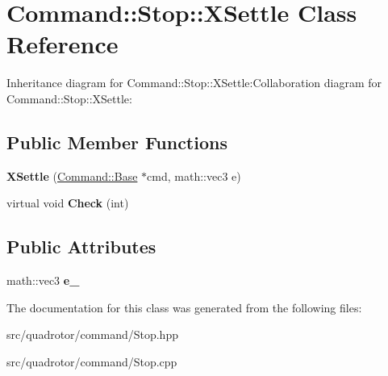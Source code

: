 \hypertarget{classCommand_1_1Stop_1_1XSettle}{
\section{Command::Stop::XSettle Class Reference}
\label{classCommand_1_1Stop_1_1XSettle}
}
Inheritance diagram for Command::Stop::XSettle:Collaboration diagram for Command::Stop::XSettle:\subsection*{Public Member Functions}
\begin{DoxyCompactItemize}
\item 
\hypertarget{classCommand_1_1Stop_1_1XSettle_aacbc62cb356f0441f910e837b2cd0889}{
{\bfseries XSettle} (\hyperlink{classCommand_1_1Base}{Command::Base} $\ast$cmd, math::vec3 e)}
\label{classCommand_1_1Stop_1_1XSettle_aacbc62cb356f0441f910e837b2cd0889}

\item 
\hypertarget{classCommand_1_1Stop_1_1XSettle_a60ea7a816a7ea0d656551aa84a484d4d}{
virtual void {\bfseries Check} (int)}
\label{classCommand_1_1Stop_1_1XSettle_a60ea7a816a7ea0d656551aa84a484d4d}

\end{DoxyCompactItemize}
\subsection*{Public Attributes}
\begin{DoxyCompactItemize}
\item 
\hypertarget{classCommand_1_1Stop_1_1XSettle_a96f016552eec74ab167d3e0c663a8733}{
math::vec3 {\bfseries e\_\-}}
\label{classCommand_1_1Stop_1_1XSettle_a96f016552eec74ab167d3e0c663a8733}

\end{DoxyCompactItemize}


The documentation for this class was generated from the following files:\begin{DoxyCompactItemize}
\item 
src/quadrotor/command/Stop.hpp\item 
src/quadrotor/command/Stop.cpp\end{DoxyCompactItemize}
